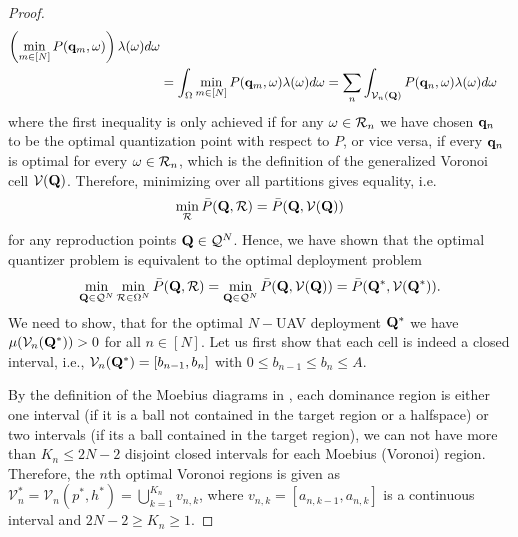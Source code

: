 \documentclass[smallabstract,smallcaptions]{dccpaper}
\newcommand{\Pbar}{\ensuremath{\bar{P}}}         %
\newcommand{\Vor}{\ensuremath{\mathcal{V}}}         %
\newcommand{\Rset}{\ensuremath{\mathcal R}}
\newcommand{\Qset}{\ensuremath{\mathcal Q}}
\begin{document}
\begin{proof}
\begin{align}
    \left(\min_{m\in[N]} P(\vq_m,\ome) \right) \lam(\ome)d\ome\\
    &=\int_{\Ome} \min_{m\in[N]} P(\vq_m,\ome) \lam(\ome)d\ome
    =\sum_n \int_{\Vor_n(\vQ)} P(\vq_n,\ome) \lam(\ome)d\ome\notag
  \end{align} 
  where the first inequality is only achieved if for any $\ome\in \Rset_n$ we have chosen ${\mathbf q}_n$ to be the optimal
  quantization point with respect to $P$, or vice versa, if every ${\mathbf q}_n$ is optimal for every $\ome\in \Rset_n$, which is the
  definition of the generalized Voronoi cell $\Vor(\vQ)$. Therefore, minimizing over all partitions gives equality, i.e.
  \begin{align}
    \min_{\Rset} \Pbar(\vQ,\Rset)=\Pbar(\vQ,\Vor(\vQ))
  \end{align}
  for any reproduction points $\vQ\in\Qset^N$.
  Hence, we have shown that the optimal quantizer problem is equivalent to the optimal deployment problem
  \begin{align}
    \min_{\vQ\in\Qset^N} \min_{\Rset\in\Ome^N} \Pbar(\vQ,\Rset) = \min_{\vQ\in\Qset^N}
    \Pbar(\vQ,\Vor(\vQ))=\Pbar(\vQ^*,\Vor(\vQ^*)).\label{eq:optquanteqoptdeploy}
  \end{align}
  We need to show, that for the optimal $N-$UAV deployment $\mathbf Q^*$ we have $\mu(\Vor_n(\vQ^*))>0$ for all $n\in[N]$.
  Let us first show that each cell is indeed a closed interval, i.e., $\Vor_n(\vQ^*)=[b_{n-1},b_n]$ with $0\leq b_{n-1}\leq
  b_n\leq A$. 
  
  By the definition of the
  Moebius diagrams in , each dominance region is either one interval (if it is a ball not contained
  in the target region or a halfspace) or two intervals (if its a ball contained in the target region), we can not have
  more than $K_n\leq 2N-2$ disjoint closed intervals for each Moebius (Voronoi) region.  Therefore, the $n$th optimal
  Voronoi regions is given as $\Vor^*_n=\Vor_n(p^*, h^*)=\bigcup_{k=1}^{K_n}v_{n,k}$, where $v_{n,k}=[a_{n,k-1},a_{n,k}]$
  is a continuous interval and $2N-2\geq K_n\geq 1$.


\end{proof}
\end{document}
